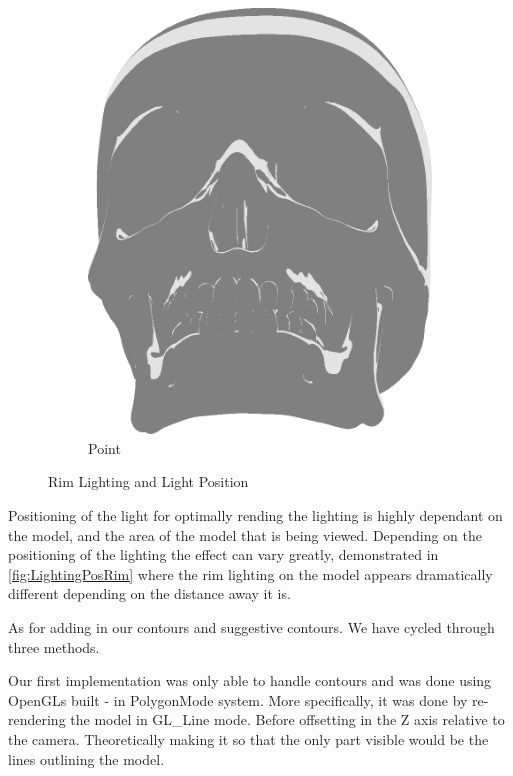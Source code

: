 \begin{figure}[h]
\begin{subfigure}[b]{0.18\textwidth}
        \includegraphics[width=\textwidth]{img/Lighting/Point.png}
        \caption{Point}
        \label{fig:LightingPosPos}
    \end{subfigure}
\caption{Rim Lighting and Light Position}
 \label{fig:LightingPosRim}
 \end{figure}

Positioning of the light for optimally rending the lighting is highly dependant on the model, and the area of the model that is being viewed. Depending on the positioning of the lighting the effect can vary greatly, demonstrated in \autoref{fig:LightingPosRim} where the rim lighting on the model appears dramatically different depending on the distance away it is.

\newpage %
As for adding in our contours and suggestive contours. We have cycled through three methods.

Our first implementation was only able to handle contours and was done using OpenGLs built - in PolygonMode system. More specifically, it was done by re-rendering the model in GL\_Line mode. Before offsetting in the Z axis relative to the camera. Theoretically making it so that the only part visible would be the lines outlining the model.

